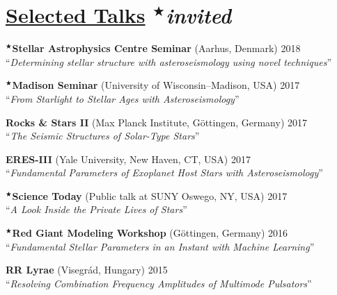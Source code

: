   
  \section*{{\sc\underline{Selected Talks}} \hfill {\normalsize\normalfont $^{\scriptscriptstyle\bigstar}$\emph{invited}}}
  \vspace*{-2mm}
  $^{\scriptscriptstyle\bigstar}$\textbf{Stellar Astrophysics Centre Seminar} (Aarhus, Denmark) \hfill{2018} \\
  \hphantom{$^{\scriptscriptstyle\bigstar}$}``\emph{Determining stellar structure with asteroseismology using novel techniques}''

  \vspace{1mm}
  \noindent $^{\scriptscriptstyle\bigstar}$\textbf{Madison Seminar} (University of Wisconsin--Madison, USA) \hfill{2017} \\
  \hphantom{$^{\scriptscriptstyle\bigstar}$}``\emph{From Starlight to Stellar Ages with Asteroseismology}''
  
  \vspace{1mm}
  \noindent \hphantom{$^{\scriptscriptstyle\bigstar}$}\textbf{Rocks \& Stars II} (Max Planck Institute, G\"ottingen, Germany) \hfill{2017} \\
  \hphantom{$^{\scriptscriptstyle\bigstar}$}``\emph{The Seismic Structures of Solar-Type Stars}''
  
  \vspace{1mm}
  \noindent \hphantom{$^{\scriptscriptstyle\bigstar}$}\textbf{ERES-III} (Yale University, New Haven, CT, USA) \hfill{2017} \\
  \hphantom{$^{\scriptscriptstyle\bigstar}$}``\emph{Fundamental Parameters of Exoplanet Host Stars with Asteroseismology}''
  
  \vspace{1mm}
  \noindent $^{\scriptscriptstyle\bigstar}$\textbf{Science Today} (Public talk at SUNY Oswego, NY, USA) \hfill{2017} \\
  \hphantom{$^{\scriptscriptstyle\bigstar}$}``\emph{A Look Inside the Private Lives of Stars}''
  
  \vspace{1mm}
  \noindent $^{\scriptscriptstyle\bigstar}$\textbf{Red Giant Modeling Workshop} (G\"ottingen, Germany) \hfill{2016} \\
  \hphantom{$^{\scriptscriptstyle\bigstar}$}``\emph{Fundamental Stellar Parameters in an Instant with Machine Learning}''
  
  \vspace{1mm}
  \noindent \hphantom{$^{\scriptscriptstyle\bigstar}$}\textbf{RR Lyrae} (Visegr\'ad, Hungary) \hfill{2015} \\
  \hphantom{$^{\scriptscriptstyle\bigstar}$}``\emph{Resolving Combination Frequency Amplitudes of Multimode Pulsators}''
  
